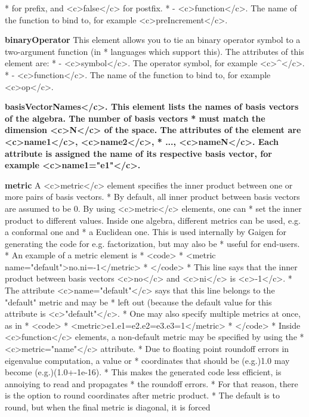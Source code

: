 \documentclass[10pt, a4paper]{article}
\begin{document}
\begin{itemize}
 *           for prefix, and <c>false</c> for postfix. 
 *        - <c>function</c>. The name of the function to bind to, for example <c>preIncrement</c>.
\item {\bf binaryOperator} This element allows you to tie an binary operator symbol to a two-argument function (in
 *     languages which support this). The attributes of this element are:
 *        - <c>symbol</c>. The operator symbol, for example <c>^</c>.
 *        - <c>function</c>. The name of the function to bind to, for example <c>op</c>.
\item {\bf basisVectorNames</c>. This element lists the names of basis vectors of the algebra. The number of basis vectors
 *     must match the dimension <c>N</c> of the space. The attributes of the element are <c>name1</c>, <c>name2</c>, 
 *     ..., <c>nameN</c>. Each attribute is assigned the name of its respective basis vector, for example <c>name1="e1"</c>.
\item {\bf metric} A <c>metric</c> element specifies the inner product between one or more pairs of basis vectors.
 *     By default, all inner product between basis vectors are assumed to be 0. By using <c>metric</c> elements, one can
 *     set the inner product to different values. Inside one algebra, different metrics can be used, e.g. a conformal one and
 *     a Euclidean one. This is used internally by Gaigen for generating the code for e.g. factorization, but may also be
 *     useful for end-users.
 *     An example of a metric element is 
 *     <code>
 *     <metric name="default">no.ni=-1</metric>
 *     </code>
 *     This line says that the inner product between basis vectors <c>no</c> and <c>ni</c> is <c>-1</c>.
 *     The attribute <c>name="default"</c> says that this line belongs to the "default" metric and may be
 *     left out (because the default value for this attribute is <c>"default"</c>.
 *     One may also specify multiple metrics at once, as in
 *     <code>
 *     <metric>e1.e1=e2.e2=e3.e3=1</metric>
 *     </code>
 *     Inside <c>function</c> elements, a non-default metric may be specified by using the 
 *     <c>metric="name"</c> attribute.
 *     Due to floating point roundoff errors in eigenvalue computation, a value or
 *     coordinates that should be (e.g.)1.0 may become (e.g.)(1.0+-1e-16).
 *     This makes the generated code less efficient, is annoiying to read and propagates
 *     the roundoff errors.
 *     For that reason, there is the option to round coordinates after metric product.
 *     The default is to round, but when the final metric is diagonal, it is forced
}
\end{itemize}
\end{document}
